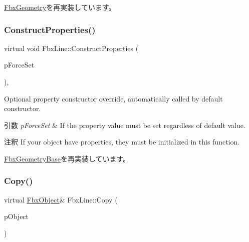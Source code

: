 \hyperlink{class_fbx_geometry_a26ca96a86f17783c45ff83b33d2b5324}{Fbx\+Geometry}を再実装しています。

\mbox{\label{class_fbx_line_a48df4b6cd889814d3fe7ca5bb09bcc78}} 
\subsubsection{\texorpdfstring{Construct\+Properties()}{ConstructProperties()}}
{\footnotesize\ttfamily virtual void Fbx\+Line\+::\+Construct\+Properties (\begin{DoxyParamCaption}\item[{bool}]{p\+Force\+Set }\end{DoxyParamCaption})\hspace{0.3cm}{\ttfamily [protected]}, {\ttfamily [virtual]}}

Optional property constructor override, automatically called by default constructor. 
\begin{DoxyParams}{引数}
{\em p\+Force\+Set} & If the property value must be set regardless of default value. \\
\hline
\end{DoxyParams}
\begin{DoxyRemark}{注釈}
If your object have properties, they must be initialized in this function. 
\end{DoxyRemark}


\hyperlink{class_fbx_geometry_base_a94ee142ac1d40be3aebb4d9441431921}{Fbx\+Geometry\+Base}を再実装しています。

\mbox{\label{class_fbx_line_aeb9e0c53cf02d3e4e206b25c87c06256}} 
\subsubsection{\texorpdfstring{Copy()}{Copy()}}
{\footnotesize\ttfamily virtual \hyperlink{class_fbx_object}{Fbx\+Object}\& Fbx\+Line\+::\+Copy (\begin{DoxyParamCaption}\item[{const \hyperlink{class_fbx_object}{Fbx\+Object} \&}]{p\+Object }\end{DoxyParamCaption})\hspace{0.3cm}{\ttfamily [virtual]}}

